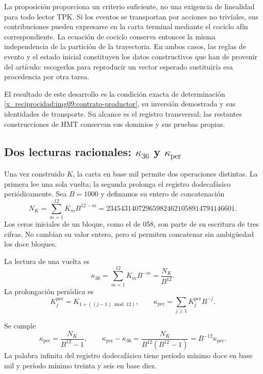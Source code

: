 La proposición proporciona un criterio suficiente, no una exigencia de
linealidad para todo lector TPK. Si los eventos se transportan por acciones
no triviales, sus contribuciones pueden expresarse en la carta terminal
mediante el cociclo afín correspondiente. La ecuación de cociclo conserva
entonces la misma independencia de la partición de la trayectoria.
En ambos casos, las reglas de evento y el estado inicial constituyen los
datos constructivos que han de provenir del artículo: escogerlos para
reproducir un vector esperado sustituiría esa procedencia por otra tarea.

El resultado de este desarrollo es la condición exacta de determinación
\eqref{x_reciprocidad:img09:contrato-productor}, su inversión demostrada y sus identidades
de transporte. Su alcance es el registro transversal; las restantes
construcciones de HMT conservan sus dominios y sus pruebas propias.



\subsection{Dos lecturas racionales: \texorpdfstring{\(\kappa_{36}\)}{kappa36} y \texorpdfstring{\(\kappa_{\mathrm{per}}\)}{kappa periódica}}
\label{x_reciprocidad:subsec:k-kappas}

Una vez construido \(K\), la carta en base mil permite dos operaciones
distintas. La primera lee una sola vuelta; la segunda prolonga el registro dodecafásico
periódicamente. Sea \(B=1000\) y definamos su entero de concatenación
\begin{equation}
 N_K=\sum_{m=1}^{12}K_mB^{12-m}
 =234543140729659824621058914794146601.
 \label{x_reciprocidad:eq:k-numerador}
\end{equation}
Los ceros iniciales de un bloque, como el de 058, son parte de su escritura
de tres cifras. No cambian su valor entero, pero sí permiten concatenar
sin ambigüedad los doce bloques.

\begin{definition}
\label{x_reciprocidad:def:k-kappas}
La lectura de una vuelta es
\[
 \kappa_{36}=\sum_{m=1}^{12}K_mB^{-m}=\frac{N_K}{B^{12}}.
\]
La prolongación periódica es
\[
 K_j^{\mathrm{per}}=K_{1+((j-1)\bmod12)},\qquad
 \kappa_{\mathrm{per}}=\sum_{j\geq1}K_j^{\mathrm{per}}B^{-j}.
\]
\end{definition}

\begin{proposition}
\label{x_reciprocidad:prop:k-periodo}
Se cumple
\begin{equation}
 \kappa_{\mathrm{per}}=\frac{N_K}{B^{12}-1},\qquad
 \kappa_{\mathrm{per}}-\kappa_{36}
 =\frac{N_K}{B^{12}(B^{12}-1)}
 =B^{-12}\kappa_{\mathrm{per}}.
 \label{x_reciprocidad:eq:k-diferencia-kappas}
\end{equation}
La palabra infinita del registro dodecafásico tiene período mínimo doce en base mil y
período mínimo treinta y seis en base diez.
\end{proposition}

